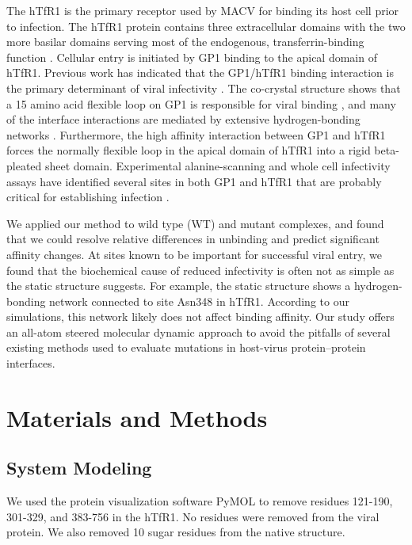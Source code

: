 \documentclass[12pt]{article}
\begin{document}
The hTfR1 is the primary receptor used by MACV for binding its host cell prior to infection. The hTfR1 protein contains three extracellular domains with the two more basilar domains serving most of the endogenous, transferrin-binding function \citep{Abraham2010,Rad20112}. Cellular entry is initiated by GP1 binding to the apical domain of hTfR1. Previous work has indicated that the GP1/hTfR1 binding interaction is the primary determinant of viral infectivity \citep{Rad20111,Rad20112}. The co-crystal structure shows that a 15 amino acid flexible loop on GP1 is responsible for viral binding \citep{Abraham2010,Rad20112}, and many of the interface interactions are mediated by extensive hydrogen-bonding networks \citep{Abraham2010}. Furthermore, the high affinity interaction between GP1 and hTfR1 forces the normally flexible loop in the apical domain of hTfR1 into a rigid beta-pleated sheet domain. Experimental alanine-scanning and whole cell infectivity assays have identified several sites in both GP1 and hTfR1 that are probably critical for establishing infection \citep{Rad20111,Rad20112}.

We applied our method to wild type (WT) and mutant complexes, and found that we could resolve relative differences in unbinding and predict significant affinity changes. At sites known to be important for successful viral entry, we found that the biochemical cause of reduced infectivity is often not as simple as the static structure suggests. For example, the static structure shows a hydrogen-bonding network connected to site Asn348 in hTfR1. According to our simulations, this network likely does not affect binding affinity. Our study offers an all-atom steered molecular dynamic approach to avoid the pitfalls of several existing methods used to evaluate mutations in host-virus protein--protein interfaces.

\section*{Materials and Methods}

\subsection*{System Modeling}

We used the protein visualization software PyMOL \citep{PyMOL} to remove residues 121-190, 301-329, and 383-756 in the hTfR1. No residues were removed from the viral protein. We also removed 10 sugar residues from the native structure.
\end{document}
